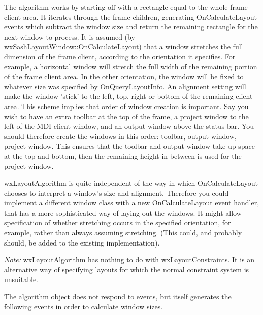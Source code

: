 The algorithm works by starting off with a rectangle equal to the whole frame client area.
It iterates through the frame children, generating OnCalculateLayout events which subtract
the window size and return the remaining rectangle for the next window to process. It
is assumed (by wxSashLayoutWindow::OnCalculateLayout) that a window stretches the full dimension
of the frame client, according to the orientation it specifies. For example, a horizontal window
will stretch the full width of the remaining portion of the frame client area.
In the other orientation, the window will be fixed to whatever size was specified by
OnQueryLayoutInfo. An alignment setting will make the window 'stick' to the left, top, right or
bottom of the remaining client area. This scheme implies that order of window creation is important.
Say you wish to have an extra toolbar at the top of the frame, a project window to the left of
the MDI client window, and an output window above the status bar. You should therefore create
the windows in this order: toolbar, output window, project window. This ensures that the toolbar and
output window take up space at the top and bottom, then the remaining height in between is used for
the project window.

wxLayoutAlgorithm is quite independent of the way in which
OnCalculateLayout chooses to interpret a window's size and alignment. Therefore you
could implement a different window class with a new OnCalculateLayout event handler,
that has a more sophisticated way of laying out the windows. It might allow
specification of whether stretching occurs in the specified orientation, for example,
rather than always assuming stretching. (This could, and probably should, be added to the existing
implementation).

{\it Note:} wxLayoutAlgorithm has nothing to do with wxLayoutConstraints. It is an alternative
way of specifying layouts for which the normal constraint system is unsuitable.




The algorithm object does not respond to events, but itself generates the
following events in order to calculate window sizes.

\twocolwidtha{7cm}%
\begin{twocollist}\itemsep=0pt
\end{twocollist}

